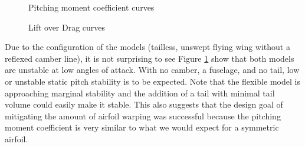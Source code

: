 \documentclass[11pt]{ucthesis}
\begin{document}
\begin{figure}
\hfill
{}
\hfill
{}
\hfill
\caption{Pitching moment coefficient curves}
\label{fig:CM}
\end{figure}

\begin{figure}
\hfill
{}
\hfill
{}
\hfill
\caption{Lift over Drag curves}
\label{fig:LD}
\end{figure}
Due to the configuration of the models (tailless, unswept flying wing without a reflexed camber line), it is not surprising to see Figure \ref{fig:CM} show that both models are unstable at low angles of attack. With no camber, a fuselage, and no tail, low or unstable static pitch stability is to be expected. Note that the flexible model is approaching marginal stability and the addition of a tail with minimal tail volume could easily make it stable. This also suggests that the design goal of mitigating the amount of airfoil warping was successful because the pitching moment coefficient is very similar to what we would expect for a symmetric airfoil.
\end{document}
